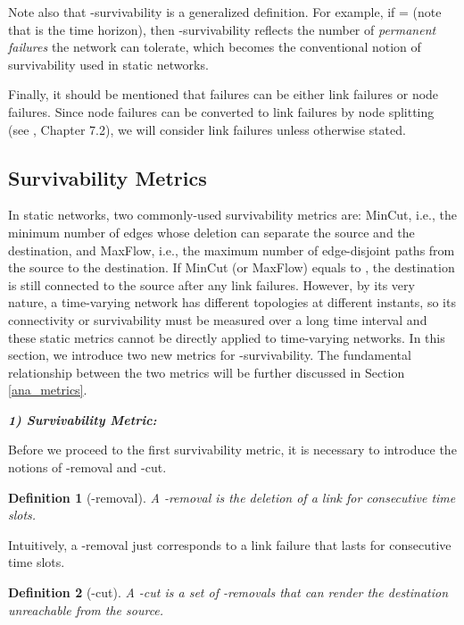 \documentclass[10pt, conference, letterpaper]{IEEEtran}
\newtheorem{definition}{Definition}
\begin{document}
Note also that -survivability is a generalized definition. For example, if  =  (note that  is the time horizon), then -survivability reflects the number of \emph{permanent failures} the network can tolerate, which becomes the conventional notion of survivability used in static networks.


Finally, it should be mentioned that failures can be either link failures or node failures. Since node failures can be converted to link failures by node splitting (see \cite{LP}, Chapter 7.2), we will consider link failures unless otherwise stated.
\subsection{Survivability Metrics}\label{intro_metrics}
In static networks, two commonly-used survivability metrics are: MinCut, i.e., the minimum number of edges whose deletion can separate the source and the destination, and MaxFlow, i.e., the maximum number of edge-disjoint paths from the source to the destination.  If MinCut (or MaxFlow) equals to , the destination is still connected to the source after any  link failures. However, by its very nature, a time-varying network has different topologies at different instants, so its connectivity or survivability must be measured over a long time interval and these static metrics cannot be directly applied to time-varying networks. In this section, we introduce two new metrics for -survivability. The fundamental relationship between the two metrics will be further discussed in Section \ref{ana_metrics}.

\vspace{1mm}

\noindent \emph{\textbf{1) Survivability Metric: }}

\vspace{1mm}

Before we proceed to the first survivability metric, it is necessary to introduce the notions of -removal and -cut.
\begin{definition}[{-removal}]
A -removal is the deletion of a link for  consecutive time slots.
\end{definition}

\noindent Intuitively, a -removal just corresponds to a link failure that lasts for  consecutive time slots. 



\begin{definition}[{-cut}]
A -cut  is a set of -removals that can render the destination unreachable from the source.
\end{definition}
\end{document}
